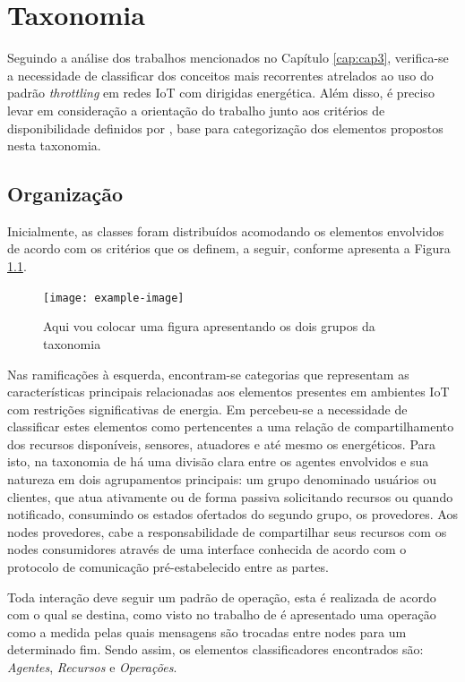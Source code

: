 \chapter{Taxonomia}
\label{cap:cap4}

Seguindo a análise dos trabalhos mencionados no Capítulo \ref{cap:cap3}, verifica-se a necessidade de classificar dos conceitos mais recorrentes atrelados ao uso do padrão \textit{throttling} em redes IoT com dirigidas energética. Além disso, é preciso levar em consideração a orientação do trabalho junto aos critérios de disponibilidade definidos por \cite{avizienis_basic_2004}, base para categorização dos elementos propostos nesta taxonomia. 

\section{Organização}

Inicialmente, as classes foram distribuídos acomodando os elementos envolvidos de acordo com os critérios que os definem, a seguir, conforme apresenta a Figura \ref{fig:taxonomia_geral}.


\begin{figure}[h]
\noindent\texttt{[image: example-image]} 
\caption{Aqui vou colocar uma figura apresentando os dois grupos da taxonomia}
\label{fig:taxonomia_geral}
\centering
\end{figure}

Nas ramificações à esquerda, encontram-se categorias que representam as características principais relacionadas aos elementos presentes em ambientes \acf{IoT} com restrições significativas de energia. Em \cite{kansal_power_2007}  percebeu-se a necessidade de classificar estes elementos como pertencentes a uma relação de compartilhamento dos recursos disponíveis, sensores, atuadores e até mesmo os energéticos. Para isto, na taxonomia de \cite{avizienis_basic_2004} há uma divisão clara entre os agentes envolvidos e sua natureza em dois agrupamentos principais: um grupo denominado usuários ou clientes, que atua ativamente ou de forma passiva solicitando recursos ou quando notificado, consumindo os estados ofertados do segundo grupo, os provedores. Aos nodes provedores, cabe a responsabilidade de compartilhar seus recursos com os nodes consumidores através de uma interface conhecida de acordo com o protocolo de comunicação pré-estabelecido entre as partes.

Toda interação deve seguir um padrão de operação, esta é realizada de acordo com o qual se destina, como visto no trabalho de \cite{khairnar_discrete-rate_2015} é apresentado uma operação como a medida pelas quais mensagens são trocadas entre nodes para um determinado fim. Sendo assim, os elementos classificadores encontrados são: \textit{Agentes}, \textit{Recursos} e \textit{Operações}.


